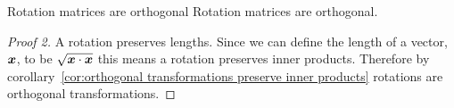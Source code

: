 \begin{theorem}{Rotation matrices are orthogonal}{}
    Rotation matrices are orthogonal.
\end{theorem}
\begin{proof}[Proof 2]
    A rotation preserves lengths.
    Since we can define the length of a vector, \(\bm{x}\), to be \(\sqrt{\bm{x}\cdot\bm{x}}\) this means a rotation preserves inner products.
    Therefore by corollary~\ref{cor:orthogonal transformations preserve inner products} rotations are orthogonal transformations.
\end{proof}

